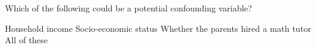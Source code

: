 \documentclass{article}
\begin{document}
\begin{mcquestions}
		
		\question[follow] Which of the following could be a potential confounding variable?
		\begin{mcanswerslist}
			\answer Household income
			\answer Socio-economic status
			\answer Whether the parents hired a math tutor
			\answer[correct] All of these
		\end{mcanswerslist}

		
	\end{mcquestions}
\end{document}
